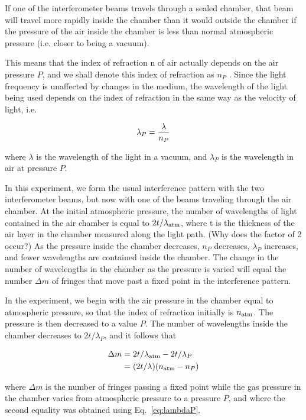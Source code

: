 If one of the interferometer beams travels through a sealed chamber, 
that beam will travel more rapidly inside the chamber than it 
would outside the chamber if the pressure of the air inside the 
chamber is less than normal atmospheric pressure (i.e. closer 
to being a vacuum).

This means that the index of refraction n of air actually depends 
on the air pressure $P$, and we shall denote this index of refraction 
as $n_P$ . Since the light frequency is unaffected by changes in 
the medium, the wavelength of the light being used depends on 
the index of refraction in the same way as the velocity of light, 
i.e.


\begin{equation}
\lambda_P = {\lambda \over n_P}
\label{eq:lambdaP}
\end{equation}

where $\lambda$ is the wavelength of the light in a vacuum, 
and $\lambda_P$ is the wavelength in air at pressure $P$.

In this experiment, we form the usual interference pattern with 
the two interferometer beams, but now with one of the beams traveling 
through the air chamber. At the initial atmospheric pressure, 
the number of wavelengths of light contained in the air chamber 
is equal to $2t/\lambda_{\rm atm}$, where t is the thickness of 
the air layer in the chamber measured along the light path. (Why 
does the factor of 2 occur?) As the pressure inside the chamber 
decreases, $n_P$ decreases, $\lambda_P$ increases, and fewer 
wavelengths are contained inside the chamber. The change in the 
number of wavelengths in the chamber as the pressure is varied 
will equal the number $\Delta m$ of fringes that move past a 
fixed point in the interference pattern. 

In the experiment, we begin with the air pressure in the chamber 
equal to atmospheric pressure, so that the index of refraction 
initially is $n_{\rm atm}$. The pressure is then decreased to a value 
$P$. The number of wavelengths inside the chamber decreases to 
$2t/\lambda_P$, and it follows that


\begin{align}
\Delta m &= 2t/\lambda_{\rm atm} - 2t/\lambda_P \nonumber \\
 &= (2t/\lambda ) ( n_{\rm atm} - n_P ) 
\label{eq:delta-m-P}
\end{align}

where $\Delta m$ is the number of fringes passing a fixed point while the 
gas pressure in the chamber varies from atmospheric pressure to a pressure $P$,
and where the second equality was obtained using Eq.~\ref{eq:lambdaP}.

